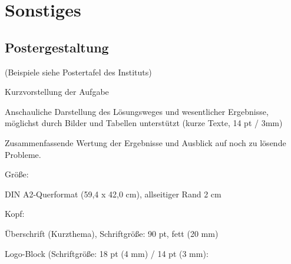 
\chapter{Sonstiges}
\label{sec:Sonstiges}

\section{Postergestaltung}
\label{sec:Postergestaltung}

(Beispiele siehe Postertafel des Instituts)

\begin{compactitem}
  \item Kurzvorstellung der Aufgabe
  \item Anschauliche Darstellung des Lösungsweges und wesentlicher Ergebnisse, möglichst durch Bilder und Tabellen unterstützt (kurze Texte, 14 pt / 3mm)
  \item Zusammenfassende Wertung der Ergebnisse und Ausblick auf noch zu lösende Probleme.
\end{compactitem}

\begin{compactitem}
  \item Größe: 
    \begin{compactitem}
      \item DIN A2-Querformat (59,4 x 42,0 cm), allseitiger Rand 2 cm
  \end{compactitem}
  \item Kopf:
    \begin{compactitem}
      \item Überschrift (Kurzthema), Schriftgröße: 90 pt, fett (20 mm)
      \item Logo-Block (Schriftgröße: 18 pt (4 mm) / 14 pt (3 mm):
    \end{compactitem}
\end{compactitem}

